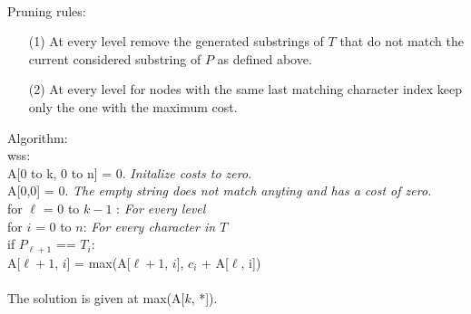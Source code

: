 \documentclass[10pt]{article}
\newcommand{\tab}{\hspace*{2em}}
\newcommand{\tabb}{\hspace*{4em}}
\newcommand{\tabbb}{\hspace*{6em}}
\begin{document}
\begin{enumerate}
					\\
					Pruning rules:
					\begin{enumerate}
						\item[(1)] At every level remove the generated substrings of $T$ that do not match the current considered substring of $P$ as defined 
						above.
						\item[(2)] At every level for nodes with the same last matching character index keep only the one with the maximum cost.
					\end{enumerate}
					Algorithm:\\
					wss:\\
					A[0 to k, 0 to n] = 0. \emph{Initalize costs to zero.}\\
					A[0,0] = 0. \emph{The empty string does not match anyting and has a cost of zero.}\\
					for $\ell$ = 0 to $k-1$ : \emph{For every level}\\
					\tab for $i$ = 0 to $n$: \emph{For every character in $T$}\\
					\tabb if $P_{\ell+1}$ == $T_{i}$:\\
					\tabbb A[$\ell+1$, $i$] = max(A[$\ell+1$, $i$], $c_{i}$ + A[$\ell$, i])\\
					\\
					The solution is given at max(A[$k$, *]). 
	\end{enumerate}
\end{document}
